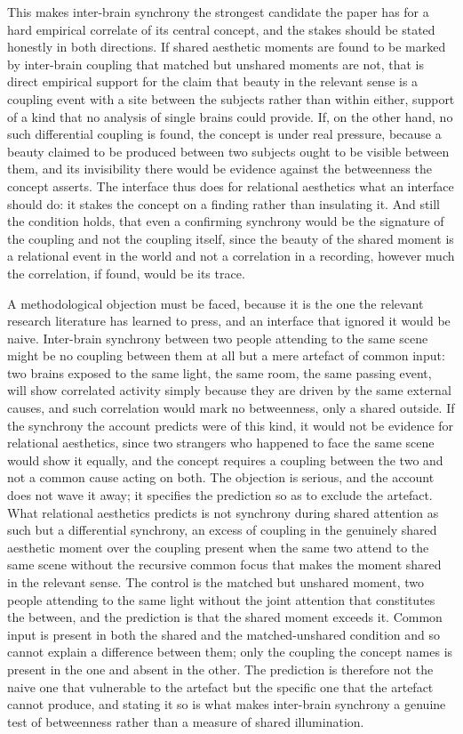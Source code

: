 This makes inter-brain synchrony the strongest candidate the paper has for a hard empirical correlate of its central concept, and the stakes should be stated honestly in both directions. If shared aesthetic moments are found to be marked by inter-brain coupling that matched but unshared moments are not, that is direct empirical support for the claim that beauty in the relevant sense is a coupling event with a site between the subjects rather than within either, support of a kind that no analysis of single brains could provide. If, on the other hand, no such differential coupling is found, the concept is under real pressure, because a beauty claimed to be produced between two subjects ought to be visible between them, and its invisibility there would be evidence against the betweenness the concept asserts. The interface thus does for relational aesthetics what an interface should do: it stakes the concept on a finding rather than insulating it. And still the condition holds, that even a confirming synchrony would be the signature of the coupling and not the coupling itself, since the beauty of the shared moment is a relational event in the world and not a correlation in a recording, however much the correlation, if found, would be its trace.

A methodological objection must be faced, because it is the one the relevant research literature has learned to press, and an interface that ignored it would be naive. Inter-brain synchrony between two people attending to the same scene might be no coupling between them at all but a mere artefact of common input: two brains exposed to the same light, the same room, the same passing event, will show correlated activity simply because they are driven by the same external causes, and such correlation would mark no betweenness, only a shared outside. If the synchrony the account predicts were of this kind, it would not be evidence for relational aesthetics, since two strangers who happened to face the same scene would show it equally, and the concept requires a coupling between the two and not a common cause acting on both. The objection is serious, and the account does not wave it away; it specifies the prediction so as to exclude the artefact. What relational aesthetics predicts is not synchrony during shared attention as such but a differential synchrony, an excess of coupling in the genuinely shared aesthetic moment over the coupling present when the same two attend to the same scene without the recursive common focus that makes the moment shared in the relevant sense. The control is the matched but unshared moment, two people attending to the same light without the joint attention that constitutes the between, and the prediction is that the shared moment exceeds it. Common input is present in both the shared and the matched-unshared condition and so cannot explain a difference between them; only the coupling the concept names is present in the one and absent in the other. The prediction is therefore not the naive one that vulnerable to the artefact but the specific one that the artefact cannot produce, and stating it so is what makes inter-brain synchrony a genuine test of betweenness rather than a measure of shared illumination.

